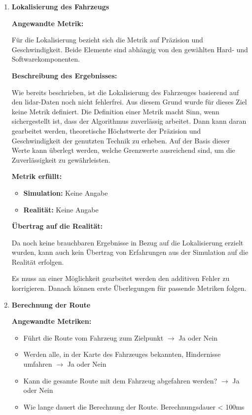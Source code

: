 \begin{enumerate}[leftmargin=*]
    \item \textbf{Lokalisierung des Fahrzeugs}

    \textbf{Angewandte Metrik:}

    Für die Lokalisierung bezieht sich die Metrik auf Präzision und Geschwindigkeit. 
    Beide Elemente sind abhängig von den gewählten Hard- und Softwarekomponenten. 

    \textbf{Beschreibung des Ergebnisses:}

    Wie bereits beschrieben, ist die Lokalisierung des Fahrzeuges basierend auf den \ac{lidar}-Daten noch nicht fehlerfrei.
    Aus diesem Grund wurde für dieses Ziel keine Metrik definiert. 
    Die Definition einer Metrik macht Sinn, wenn sichergestellt ist, dass der Algorithmus zuverlässig arbeitet.
    Dann kann daran gearbeitet werden, theoretische Höchstwerte der Präzision und Geschwindigkeit der genutzten Technik zu erheben.
    Auf der Basis dieser Werte kann überlegt werden, welche Grenzwerte ausreichend sind, um die Zuverlässigkeit zu gewährleisten.    

    \textbf{Metrik erfüllt:}
    \begin{itemize}
        \item \textbf{Simulation:} Keine Angabe
        \item \textbf{Realität:} Keine Angabe
    \end{itemize}
    
    \textbf{Übertrag auf die Realität:}

    Da noch keine brauchbaren Ergebnisse in Bezug auf die Lokalisierung erzielt wurden, 
    kann auch kein Übertrag von Erfahrungen aus der Simulation auf die Realität erfolgen.

    Es muss an einer Möglichkeit gearbeitet werden den additiven Fehler zu korrigieren. 
    Danach können erste Überlegungen für passende Metriken folgen.
    
    \item \textbf{Berechnung der Route}

    \textbf{Angewandte Metriken:}

    \begin{itemize}
        \item Führt die Route vom Fahrzeug zum Zielpunkt $\to$ Ja oder Nein
        \item Werden alle, in der Karte des Fahrzeuges bekannten, Hindernisse umfahren $\to$ Ja oder Nein
        \item Kann die gesamte Route mit dem Fahrzeug abgefahren werden? $\to$ Ja oder Nein
        \item Wie lange dauert die Berechnung der Route. Berechnungsdauer < 100ms
    \end{itemize}
    

\end{enumerate}
